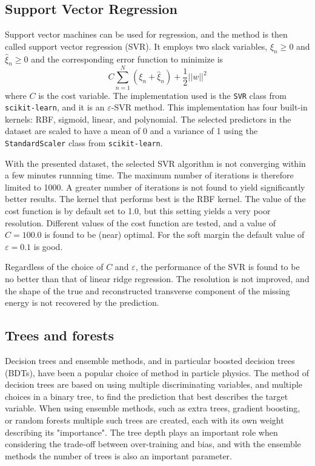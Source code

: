 \documentclass[twocolumn]{scrartcl}
\begin{document}
\subsection{Support Vector Regression}

Support vector machines can be used for regression, and the method is then called support vector regression (SVR). It employs two slack variables, $ξ_n ≥ 0$ and $\hat{ξ}_n ≥ 0$ and the corresponding error function to minimize is
\[
  C \sum_{n=1}^N(ξ_n + \hat{ξ}_n) + \frac{1}{2}||w||^2
\]
where $C$ is the cost variable. The implementation used is the \texttt{SVR} class from \texttt{scikit-learn}, and it is an $ε$-SVR method. This implementation has four built-in kernels: RBF, sigmoid, linear, and polynomial. The selected predictors in the dataset are scaled to have a mean of 0 and a variance of 1 using the \texttt{StandardScaler} class from \texttt{scikit-learn}.

With the presented dataset, the selected SVR algorithm is not converging within a few minutes runnning time. The maximum number of iterations is therefore limited to 1000. A greater number of iterations is not found to yield significantly better results. The kernel that performs best is the RBF kernel. The value of the cost function is by default set to 1.0, but this setting yields a very poor resolution. Different values of the cost function are tested, and a value of $C=100.0$ is found to be (near) optimal. For the soft margin the default value of $ε=0.1$ is good.

Regardless of the choice of $C$ and $ε$, the performance of the SVR is found to be no better than that of linear ridge regression. The resolution is not improved, and the shape of the true and reconstructed transverse component of the missing energy is not recovered by the prediction.

\subsection{Trees and forests}

Decision trees and ensemble methods, and in particular boosted decision trees (BDTs), have been a popular choice of method in particle physics. The method of decision trees are based on using multiple discriminating variables, and multiple choices in a binary tree, to find the prediction that best describes the target variable. When using ensemble methods, such as extra trees, gradient boosting, or random forests multiple such trees are created, each with its own weight describing its "importance". The tree depth plays an important role when considering the trade-off between over-training and bias, and with the ensemble methods the number of trees is also an important parameter.
\end{document}
